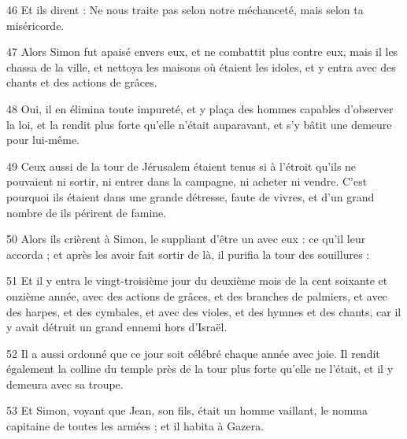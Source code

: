 \par 46 Et ils dirent : Ne nous traite pas selon notre méchanceté, mais selon ta miséricorde.
\par 47 Alors Simon fut apaisé envers eux, et ne combattit plus contre eux, mais il les chassa de la ville, et nettoya les maisons où étaient les idoles, et y entra avec des chants et des actions de grâces.
\par 48 Oui, il en élimina toute impureté, et y plaça des hommes capables d'observer la loi, et la rendit plus forte qu'elle n'était auparavant, et s'y bâtit une demeure pour lui-même.
\par 49 Ceux aussi de la tour de Jérusalem étaient tenus si à l'étroit qu'ils ne pouvaient ni sortir, ni entrer dans la campagne, ni acheter ni vendre. C'est pourquoi ils étaient dans une grande détresse, faute de vivres, et d'un grand nombre de ils périrent de famine.
\par 50 Alors ils crièrent à Simon, le suppliant d'être un avec eux : ce qu'il leur accorda ; et après les avoir fait sortir de là, il purifia la tour des souillures :
\par 51 Et il y entra le vingt-troisième jour du deuxième mois de la cent soixante et onzième année, avec des actions de grâces, et des branches de palmiers, et avec des harpes, et des cymbales, et avec des violes, et des hymnes et des chants, car il y avait détruit un grand ennemi hors d’Israël.
\par 52 Il a aussi ordonné que ce jour soit célébré chaque année avec joie. Il rendit également la colline du temple près de la tour plus forte qu'elle ne l'était, et il y demeura avec sa troupe.
\par 53 Et Simon, voyant que Jean, son fils, était un homme vaillant, le nomma capitaine de toutes les armées ; et il habita à Gazera.


